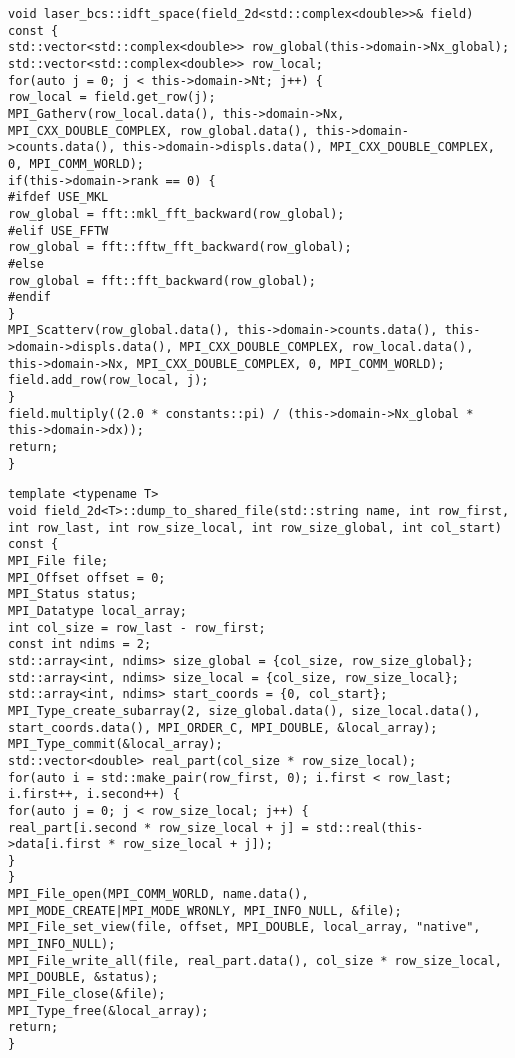 \begin{lstlisting}[style=CXX, caption=Method for performing inverse discrete Fourier transform in space]
void laser_bcs::idft_space(field_2d<std::complex<double>>& field) const {
std::vector<std::complex<double>> row_global(this->domain->Nx_global);
std::vector<std::complex<double>> row_local;
for(auto j = 0; j < this->domain->Nt; j++) {
row_local = field.get_row(j);
MPI_Gatherv(row_local.data(), this->domain->Nx, MPI_CXX_DOUBLE_COMPLEX, row_global.data(), this->domain->counts.data(), this->domain->displs.data(), MPI_CXX_DOUBLE_COMPLEX, 0, MPI_COMM_WORLD);
if(this->domain->rank == 0) {
#ifdef USE_MKL
row_global = fft::mkl_fft_backward(row_global);
#elif USE_FFTW
row_global = fft::fftw_fft_backward(row_global);
#else
row_global = fft::fft_backward(row_global);
#endif
}
MPI_Scatterv(row_global.data(), this->domain->counts.data(), this->domain->displs.data(), MPI_CXX_DOUBLE_COMPLEX, row_local.data(), this->domain->Nx, MPI_CXX_DOUBLE_COMPLEX, 0, MPI_COMM_WORLD);
field.add_row(row_local, j);
}
field.multiply((2.0 * constants::pi) / (this->domain->Nx_global * this->domain->dx));
return;
}
\end{lstlisting}

\begin{lstlisting}[style=CXX, caption=Method for dumping data into shared file]
template <typename T>
void field_2d<T>::dump_to_shared_file(std::string name, int row_first, int row_last, int row_size_local, int row_size_global, int col_start) const {
MPI_File file;
MPI_Offset offset = 0;
MPI_Status status;
MPI_Datatype local_array;
int col_size = row_last - row_first;
const int ndims = 2;
std::array<int, ndims> size_global = {col_size, row_size_global};
std::array<int, ndims> size_local = {col_size, row_size_local};
std::array<int, ndims> start_coords = {0, col_start};
MPI_Type_create_subarray(2, size_global.data(), size_local.data(), start_coords.data(), MPI_ORDER_C, MPI_DOUBLE, &local_array);
MPI_Type_commit(&local_array);
std::vector<double> real_part(col_size * row_size_local);
for(auto i = std::make_pair(row_first, 0); i.first < row_last; i.first++, i.second++) {
for(auto j = 0; j < row_size_local; j++) {
real_part[i.second * row_size_local + j] = std::real(this->data[i.first * row_size_local + j]);
}
}
MPI_File_open(MPI_COMM_WORLD, name.data(), MPI_MODE_CREATE|MPI_MODE_WRONLY, MPI_INFO_NULL, &file);
MPI_File_set_view(file, offset, MPI_DOUBLE, local_array, "native", MPI_INFO_NULL);
MPI_File_write_all(file, real_part.data(), col_size * row_size_local, MPI_DOUBLE, &status);
MPI_File_close(&file);
MPI_Type_free(&local_array);
return;
}
\end{lstlisting}

